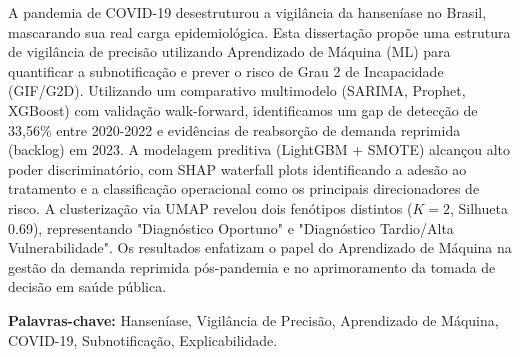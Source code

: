 \documentclass[
12pt, %
oneside, %
english, %
onehalfspacing,%
liststotoc, %
parskip, %
headsepline, %
]{MastersDoctoralThesis} %
\begin{document}
\begin{resumo}
A pandemia de COVID-19 desestruturou a vigilância da hanseníase no Brasil, mascarando sua real carga epidemiológica. Esta dissertação propõe uma estrutura de vigilância de precisão utilizando Aprendizado de Máquina (ML) para quantificar a subnotificação e prever o risco de Grau 2 de Incapacidade (GIF/G2D). Utilizando um comparativo multimodelo (SARIMA, Prophet, XGBoost) com validação walk-forward, identificamos um gap de detecção de 33,56\% entre 2020-2022 e evidências de reabsorção de demanda reprimida (backlog) em 2023. A modelagem preditiva (LightGBM + SMOTE) alcançou alto poder discriminatório, com SHAP waterfall plots identificando a adesão ao tratamento e a classificação operacional como os principais direcionadores de risco. A clusterização via UMAP revelou dois fenótipos distintos ($K=2$, Silhueta 0.69), representando "Diagnóstico Oportuno" e "Diagnóstico Tardio/Alta Vulnerabilidade". Os resultados enfatizam o papel do Aprendizado de Máquina na gestão da demanda reprimida pós-pandemia e no aprimoramento da tomada de decisão em saúde pública.

\textbf{Palavras-chave:} Hanseníase, Vigilância de Precisão, Aprendizado de Máquina, COVID-19, Subnotificação, Explicabilidade.
\end{resumo}

\tableofcontents
\listoffigures
\listoftables

\mainmatter
\pagestyle{thesis}




 
 
 


\appendix %





\printbibliography[heading=bibintoc]
\end{document}
